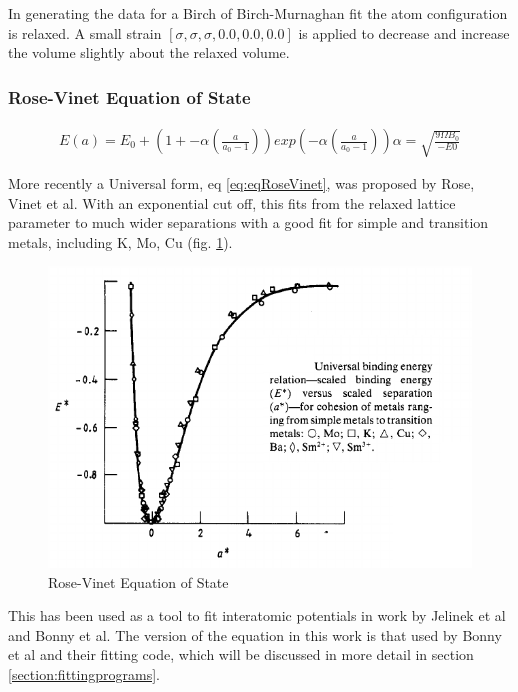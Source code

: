 In generating the data for a Birch of Birch-Murnaghan fit the atom configuration is relaxed.  A small strain $\left[\sigma, \sigma, \sigma, 0.0, 0.0, 0.0\right]$ is applied to decrease and increase the volume slightly about the relaxed volume.


\FloatBarrier
\subsubsection{Rose-Vinet Equation of State}

\begin{equation}
\begin{split}
E(a) = E_0 + \left(1 + -\alpha \left(\frac{a}{a_0 - 1}\right)\right) exp\left(-\alpha \left(\frac{a}{a_0 - 1}\right)\right) 
\alpha = \sqrt{\frac{9 \Omega B_0}{-E0}}
\end{split}
\label{eq:eqRoseVinet}
\end{equation}

More recently a Universal form, eq \ref{eq:eqRoseVinet}, was proposed by Rose, Vinet et al\cite{rosevinet}.  With an exponential cut off, this fits from the relaxed lattice parameter to much wider separations with a good fit for simple and transition metals, including K, Mo, Cu (fig. \ref{fig:rosevinet}).

\begin{figure}[htbp]
  \begin{center}
    \includegraphics[width=.5\linewidth]{chapters/background_potential_fitting/images/rosevinet.png}%
    \caption{Rose-Vinet Equation of State}
    \label{fig:rosevinet}
  \end{center}
\end{figure}

This has been used as a tool to fit interatomic potentials in work by Jelinek et al\cite{meamalsibaskes} and Bonny et al\cite{ipbonny}.  The version of the equation in this work is that used by Bonny et al and their fitting code, which will be discussed in more detail in section \ref{section:fittingprograms}.




